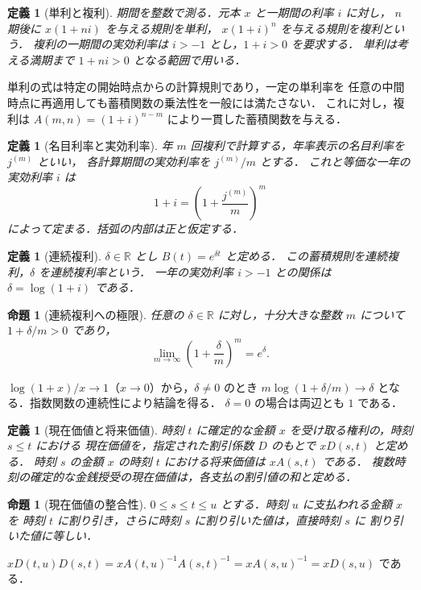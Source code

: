 \documentclass[a5paper,10pt,onecolumn]{jsarticle}
\makeatletter
\theoremstyle{mathnotetheorem}
\newtheorem{definition}[theorem]{定義}
\newtheorem{proposition}[theorem]{命題}
\renewcommand{\proofname}{証明}
\renewenvironment{proof}[1][\proofname]{%
  \par\pushQED{\qed}\normalfont\topsep4\p@\@plus2\p@\relax
  \trivlist\item[\hskip\labelsep\bfseries #1]\ignorespaces
}{\popQED\endtrivlist\@endpefalse}
\newcommand{\R}{\mathbb{R}}
\makeatother
\begin{document}
\begin{definition}[単利と複利]
期間を整数で測る．元本 $x$ と一期間の利率 $i$ に対し，
$n$ 期後に $x(1+ni)$ を与える規則を\emph{単利}，
$x(1+i)^n$ を与える規則を\emph{複利}という．
複利の一期間の実効利率は $i>-1$ とし，$1+i>0$ を要求する．
単利は考える満期まで $1+ni>0$ となる範囲で用いる．
\end{definition}

単利の式は特定の開始時点からの計算規則であり，一定の単利率を
任意の中間時点に再適用しても蓄積関数の乗法性を一般には満たさない．
これに対し，複利は $A(m,n)=(1+i)^{n-m}$ により一貫した蓄積関数を与える．

\begin{definition}[名目利率と実効利率]
年 $m$ 回複利で計算する，年率表示の\emph{名目利率}を $j^{(m)}$ といい，
各計算期間の実効利率を $j^{(m)}/m$ とする．
これと等価な一年の\emph{実効利率} $i$ は
\[
 1+i=\left(1+\frac{j^{(m)}}m\right)^m
\]
によって定まる．括弧の内部は正と仮定する．
\end{definition}

\begin{definition}[連続複利]
$\delta\in\R$ とし $B(t)=e^{\delta t}$ と定める．
この蓄積規則を\emph{連続複利}，$\delta$ を連続複利率という．
一年の実効利率 $i>-1$ との関係は $\delta=\log(1+i)$ である．
\end{definition}

\begin{proposition}[連続複利への極限]\label{prop:contlimit}
任意の $\delta\in\R$ に対し，十分大きな整数 $m$ について
$1+\delta/m>0$ であり，
\[
 \lim_{m\to\infty}\left(1+\frac{\delta}{m}\right)^m=e^\delta.
\]
\end{proposition}
\begin{proof}
$\log(1+x)/x\to1$（$x\to0$）から，$\delta\ne0$ のとき
$m\log(1+\delta/m)\to\delta$ となる．指数関数の連続性により結論を得る．
$\delta=0$ の場合は両辺とも $1$ である．\end{proof}

\begin{definition}[現在価値と将来価値]
時刻 $t$ に確定的な金額 $x$ を受け取る権利の，時刻 $s\le t$ における
\emph{現在価値}を，指定された割引係数 $D$ のもとで $xD(s,t)$ と定める．
時刻 $s$ の金額 $x$ の時刻 $t$ における\emph{将来価値}は $xA(s,t)$ である．
複数時刻の確定的な金銭授受の現在価値は，各支払の割引値の和と定める．
\end{definition}

\begin{proposition}[現在価値の整合性]\label{prop:pvconsistent}
$0\le s\le t\le u$ とする．時刻 $u$ に支払われる金額 $x$ を
時刻 $t$ に割り引き，さらに時刻 $s$ に割り引いた値は，直接時刻 $s$ に
割り引いた値に等しい．
\end{proposition}
\begin{proof}
$xD(t,u)D(s,t)=xA(t,u)^{-1}A(s,t)^{-1}
=xA(s,u)^{-1}=xD(s,u)$ である．\end{proof}
\end{document}
